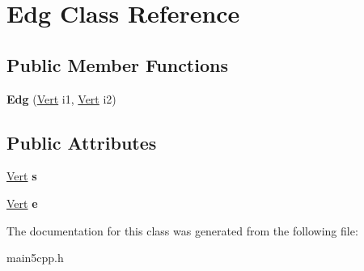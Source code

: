 \hypertarget{class_edg}{}\section{Edg Class Reference}
\label{class_edg}
\subsection*{Public Member Functions}
\begin{DoxyCompactItemize}
\item 
\mbox{\label{class_edg_a06c3f600f579c9497036558280a13a17}} 
{\bfseries Edg} (\mbox{\hyperlink{class_vert}{Vert}} i1, \mbox{\hyperlink{class_vert}{Vert}} i2)
\end{DoxyCompactItemize}
\subsection*{Public Attributes}
\begin{DoxyCompactItemize}
\item 
\mbox{\label{class_edg_a1bf2dfdbef7d62f34c9cd08469154491}} 
\mbox{\hyperlink{class_vert}{Vert}} {\bfseries s}
\item 
\mbox{\label{class_edg_ab3fb9fd99e35eabeba6eed911cbb7f93}} 
\mbox{\hyperlink{class_vert}{Vert}} {\bfseries e}
\end{DoxyCompactItemize}


The documentation for this class was generated from the following file\+:\begin{DoxyCompactItemize}
\item 
main5cpp.\+h\end{DoxyCompactItemize}
